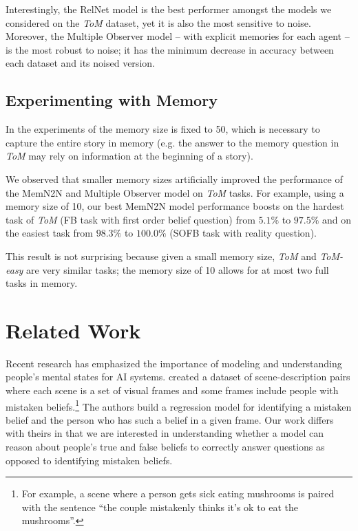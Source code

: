 Interestingly, the RelNet model is the best performer amongst the models we considered on the \textit{ToM} dataset, yet it is also the most sensitive to noise. Moreover, the Multiple Observer model -- with explicit memories for each agent -- is the most robust to noise; it has the minimum decrease in accuracy between each dataset and its noised version.

\subsection{Experimenting with Memory} In the experiments of \citet{sukhbaatar2015end} the memory size is fixed to 50, which is necessary to capture the entire story in memory (e.g. the answer to the memory question in \textit{ToM} may rely on information at the beginning of a story).

We observed that smaller memory sizes artificially improved the performance of the MemN2N and Multiple Observer model on \textit{ToM} tasks. For example, using a memory size of 10, our best MemN2N model performance boosts on the hardest task of \textit{ToM} (FB task with first order belief question) from $5.1\%$ to $97.5\%$ and on the easiest task from $98.3\%$ to $100.0\%$ (SOFB task with reality question).

This result is not surprising because given a small memory size, \textit{ToM} and
\textit{ToM-easy} are very similar tasks; the memory size of 10 allows for at most two full tasks in memory.

\section{Related Work}

Recent research has emphasized the importance of modeling and understanding people's mental states for AI systems. \citet{eysenbach2016mistaken} created a dataset of scene-description pairs where each scene is a set of visual frames and some frames include people with mistaken beliefs.\footnote{For example, a scene where a person gets sick eating mushrooms is paired with the sentence ``the couple mistakenly thinks it's ok to eat the mushrooms''.} The authors build a regression model for identifying a mistaken belief and the person who has such a belief in a given frame. Our work differs with theirs in that we are interested in understanding whether a model can reason about people's true and false beliefs to correctly answer questions as opposed to identifying mistaken beliefs. 

